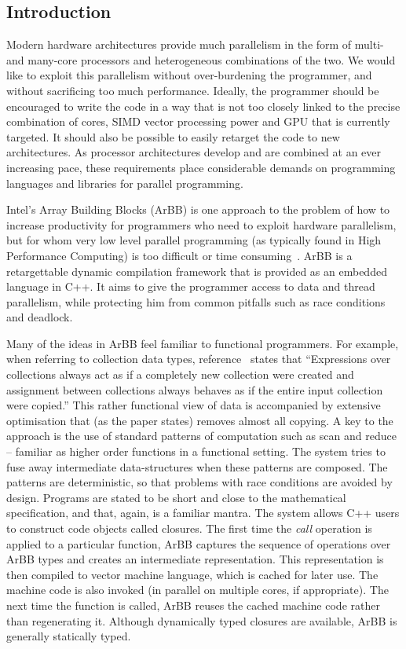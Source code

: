 
\subsection{Introduction} 

Modern hardware architectures provide much parallelism in the form of
multi- and many-core processors and heterogeneous combinations of the two.
We would like to exploit this parallelism without over-burdening the programmer, and without sacrificing too much performance.
Ideally, the programmer should be encouraged to write the code in a way that is not too closely linked to the precise combination of cores, SIMD vector processing power and GPU
that is currently targeted.
It should also be possible to easily retarget the code to new architectures.
As processor architectures develop and are combined at an ever increasing pace, these requirements place considerable demands on programming languages
and libraries for parallel programming.

Intel's Array Building Blocks (ArBB) is one approach to the problem of how to increase productivity for programmers who need to exploit hardware parallelism, but for whom very low level parallel programming (as typically found in High Performance Computing) is too difficult or time consuming~\cite{ARBB2011}. ArBB is a retargettable dynamic compilation framework that is provided as an embedded language in C++. It aims to give the programmer access to data and thread parallelism, while protecting him from common pitfalls such as race conditions and deadlock.

Many of the ideas in ArBB feel familiar to functional programmers.
For example, when referring to collection data types, reference~\cite{ARBB2011} states that ``Expressions over collections always act as if a completely new collection were created and assignment between collections always behaves as if the entire input collection were copied.''
This rather functional view of data is accompanied by extensive optimisation that (as the paper states) removes almost all copying.
A key to the approach is the use of standard patterns of computation such as scan and reduce -- familiar as higher order functions in a functional setting.
The system tries to fuse away intermediate data-structures
when these patterns are composed.
The patterns are deterministic, so that problems with race conditions are avoided by design. Programs are stated to be short and close to the mathematical specification, and that, again, is a familiar mantra. The system allows C++ users to construct code objects called closures.
The first time the {\em call} operation is applied to
a particular function, ArBB captures the sequence of operations
over ArBB types and creates an intermediate representation. 
This representation is then compiled to
vector machine language, which is
cached for later use.  The
machine code is also invoked (in parallel on multiple
cores, if appropriate). The next time the function
is called, ArBB reuses the cached machine
code rather than regenerating it.
Although dynamically typed closures are available, ArBB is generally
statically typed.




